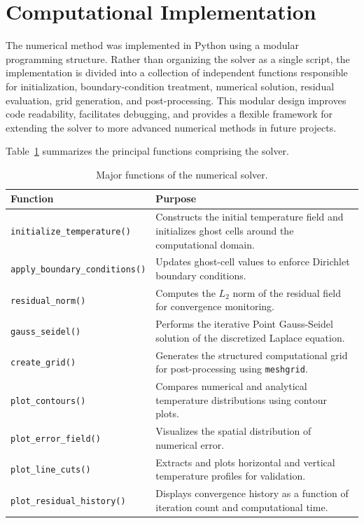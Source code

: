 \section{Computational Implementation}

The numerical method was implemented in Python using a modular programming structure. Rather than organizing the solver as a single script, the implementation is divided into a collection of independent functions responsible for initialization, boundary-condition treatment, numerical solution, residual evaluation, grid generation, and post-processing. This modular design improves code readability, facilitates debugging, and provides a flexible framework for extending the solver to more advanced numerical methods in future projects.

Table~\ref{tab:functions} summarizes the principal functions comprising the solver.

\begin{table}[H]
\centering
\caption{Major functions of the numerical solver.}
\label{tab:functions}

\begin{tabularx}{\textwidth}{l X}
\toprule
\textbf{Function} & \textbf{Purpose} \\
\midrule

\texttt{initialize\_temperature()} 
& Constructs the initial temperature field and initializes ghost cells around the computational domain. \\

\texttt{apply\_boundary\_conditions()} 
& Updates ghost-cell values to enforce Dirichlet boundary conditions. \\

\texttt{residual\_norm()} 
& Computes the $L_2$ norm of the residual field for convergence monitoring. \\

\texttt{gauss\_seidel()} 
& Performs the iterative Point Gauss-Seidel solution of the discretized Laplace equation. \\

\texttt{create\_grid()} 
& Generates the structured computational grid for post-processing using \texttt{meshgrid}. \\

\texttt{plot\_contours()} 
& Compares numerical and analytical temperature distributions using contour plots. \\

\texttt{plot\_error\_field()} 
& Visualizes the spatial distribution of numerical error. \\

\texttt{plot\_line\_cuts()} 
& Extracts and plots horizontal and vertical temperature profiles for validation. \\

\texttt{plot\_residual\_history()} 
& Displays convergence history as a function of iteration count and computational time. \\

\bottomrule
\end{tabularx}

\end{table}

